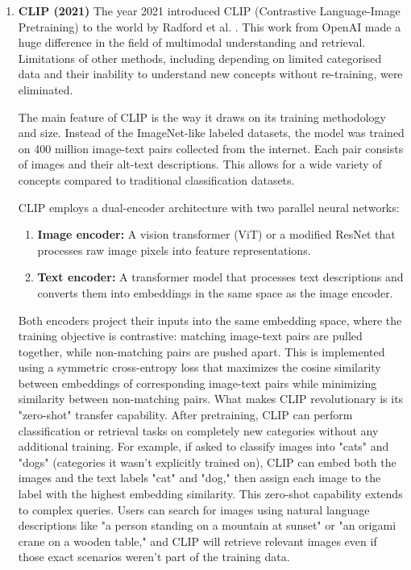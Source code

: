 \documentclass[conference]{IEEEtran}
\begin{document}
\begin{enumerate}
    
\item\textbf{CLIP (2021)}  The year 2021 introduced CLIP (Contrastive Language-Image Pretraining) to the world by Radford et al. \cite{radford2021clip}. This work from OpenAI made a huge difference in the field of multimodal understanding and retrieval. Limitations of other methods, including depending on limited categorised data and their inability to understand new concepts without re-training, were eliminated.

The main feature of CLIP is the way it draws on its training methodology and size. Instead of the ImageNet-like labeled datasets, the model was trained on 400 million image-text pairs collected from the internet. Each pair consists of images and their alt-text descriptions. This allows for a wide variety of concepts compared to traditional classification datasets.

CLIP employs a dual-encoder architecture with two parallel neural networks:

\begin{enumerate}
    \item \textbf{Image encoder:} A vision transformer (ViT) or a modified ResNet that processes raw image pixels into feature representations.
    
    \item \textbf{Text encoder:} A transformer model that processes text descriptions and converts them into embeddings in the same space as the image encoder.
\end{enumerate}

Both encoders project their inputs into the same embedding space, where the training objective is contrastive: matching image-text pairs are pulled together, while non-matching pairs are pushed apart. This is implemented using a symmetric cross-entropy loss that maximizes the cosine similarity between embeddings of corresponding image-text pairs while minimizing similarity between non-matching pairs.
What makes CLIP revolutionary is its "zero-shot" transfer capability. After pretraining, CLIP can perform classification or retrieval tasks on completely new categories without any additional training. For example, if asked to classify images into "cats" and "dogs" (categories it wasn't explicitly trained on), CLIP can embed both the images and the text labels "cat" and "dog," then assign each image to the label with the highest embedding similarity.
This zero-shot capability extends to complex queries. Users can search for images using natural language descriptions like "a person standing on a mountain at sunset" or "an origami crane on a wooden table," and CLIP will retrieve relevant images even if those exact scenarios weren't part of the training data.


\end{enumerate}
\end{document}
